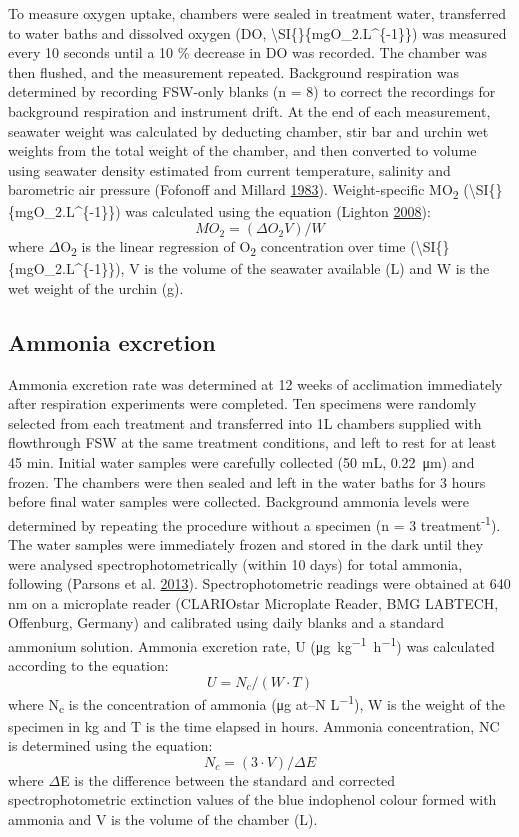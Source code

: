 \documentclass[a4paper,10pt, oneside]{memoir}
\begin{document}
To measure oxygen uptake, chambers were sealed in treatment water, transferred to water baths and dissolved oxygen (DO, \textbackslash{}SI\{\}\{mgO\_2.L\^{}\{-1\}\}) was measured every 10 seconds until a 10 \% decrease in DO was recorded.
The chamber was then flushed, and the measurement repeated.
Background respiration was determined by recording FSW-only blanks (n = 8) to correct the recordings for background respiration and instrument drift.
At the end of each measurement, seawater weight was calculated by deducting chamber, stir bar and urchin wet weights from the total weight of the chamber, and then converted to volume using seawater density estimated from current temperature, salinity and barometric air pressure (Fofonoff and Millard \protect\hyperlink{ref-Fofonoff1983}{1983}).
Weight-specific MO\textsubscript{2} (\textbackslash{}SI\{\}\{mgO\_2.L\^{}\{-1\}\}) was calculated using the equation (Lighton \protect\hyperlink{ref-Lighton2008}{2008}):
\[MO_2=(\Delta O_2 V)/W\]
where \(\Delta\)O\textsubscript{2} is the linear regression of O\textsubscript{2} concentration over time (\textbackslash{}SI\{\}\{mgO\_2.L\^{}\{-1\}\}), V is the volume of the seawater available (L) and W is the wet weight of the urchin (g).

\hypertarget{ammonia-excretion}{%
\subsection{Ammonia excretion}\label{ammonia-excretion}}

Ammonia excretion rate was determined at 12 weeks of acclimation immediately after respiration experiments were completed.
Ten specimens were randomly selected from each treatment and transferred into 1L chambers supplied with flowthrough FSW at the same treatment conditions, and left to rest for at least 45 min.
Initial water samples were carefully collected (50 mL, \SI{0.22}{\micro\m}) and frozen.
The chambers were then sealed and left in the water baths for 3 hours before final water samples were collected. Background ammonia levels were determined by repeating the procedure without a specimen (n = 3 treatment\textsuperscript{-1}).
The water samples were immediately frozen and stored in the dark until they were analysed spectrophotometrically (within 10 days) for total ammonia, following (Parsons et al. \protect\hyperlink{ref-Parsons2013}{2013}).
Spectrophotometric readings were obtained at 640 nm on a microplate reader (CLARIOstar Microplate Reader, BMG LABTECH, Offenburg, Germany) and calibrated using daily blanks and a standard ammonium solution.
Ammonia excretion rate, U (\si{\micro g.kg^{-1}.h^{-1}}) was calculated according to the equation:
\[U=N_c/(W\cdot T)\]
where N\textsubscript{c} is the concentration of ammonia (\si{\micro g} at--N \si{L^{-1}}), W is the weight of the specimen in kg and T is the time elapsed in hours. Ammonia concentration, NC is determined using the equation:
\[N_c=(3\cdot V)/\Delta E\]
where \(\Delta\)E is the difference between the standard and corrected spectrophotometric extinction values of the blue indophenol colour formed with ammonia and V is the volume of the chamber (L).
\end{document}
